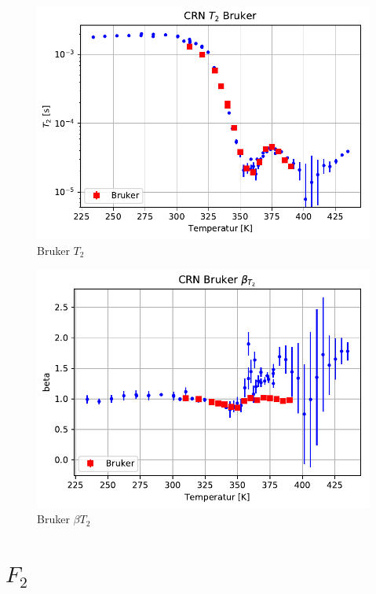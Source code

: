 \begin{figure}
	\begin{center}
		\includegraphics[width=\textwidth]{graphics/plots/BRUKER/bruker_t2.pdf}
	\end{center}
	\caption{Bruker $T_2$} \label{fig:res:bruker_t2}
\end{figure}

\begin{figure}
	\begin{center}
		\includegraphics[width=\textwidth]{graphics/plots/BRUKER/bruker_t2beta.pdf}
	\end{center}
	\caption{Bruker $\beta{T_2}$} \label{fig:res:bruker_beta_t2}
\end{figure}




\section{$F_2$} \label{section:res:F_2}


